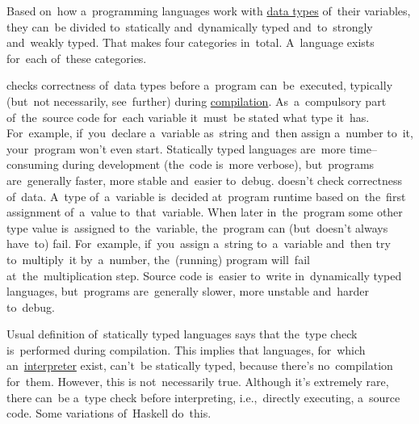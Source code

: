 Based on~how a~programming languages work with \hyperref[datatypes]{data types} of~their variables, they can~be divided to~statically and~dynamically typed and~to~strongly and~weakly typed.
That makes four categories in~total.
A~language exists for~each of~these categories.

\begin{itemize}
     checks correctness of~data types before a~program can~be~executed, typically (but~not necessarily, see~further) during \hyperref[compiledinterpretedlanguages]{compilation}.
            As~a~compulsory part of~the~source code for~each variable it~must~be stated what type it~has.
            For~example, if~you~declare a~variable as~string and~then assign a~number to~it, your~program won't even start.
            Statically typed languages are~more time--consuming during development (the~code is~more verbose), but~programs are~generally faster, more stable and~easier to~debug.
     doesn't check correctness of~data.
            A~type of~a~variable is~decided at~program runtime based on~the~first assignment of~a~value to~that~variable.
            When later in~the~program some other type value is~assigned to~the~variable, the~program can (but~doesn't always have~to) fail.
            For~example, if~you~assign a~string to~a~variable and~then try to~multiply~it by~a~number, the~(running) program will~fail at~the~multiplication step.
            Source code is~easier to~write in~dynamically typed languages, but~programs are~generally slower, more unstable and~harder to~debug.
\end{itemize}

\warningnonl Usual definition of~statically typed languages says that the~type check is~performed during compilation.
This implies that languages, for~which an~\hyperref[compiledinterpretedlanguages]{interpreter} exist, can't~be statically typed, because there's no~compilation for~them.
However, this is not~necessarily true.
Although it's extremely rare, there can~be a~type check before interpreting, i.e.,~directly executing, a~source code.
Some variations of~Haskell do~this.

